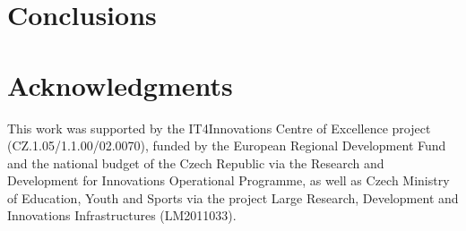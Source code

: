 \documentclass[10pt,a4paper,twocolumn]{article}
\begin{document}
\section{Conclusions}


\section*{Acknowledgments}
This work was supported by the IT4Innovations Centre of Excellence project (CZ.1.05/1.1.00/02.0070), funded by the European Regional Development Fund and the national budget of the Czech Republic via the Research and Development for Innovations Operational Programme, as well as Czech Ministry of Education, Youth and Sports via the project Large Research, Development and Innovations Infrastructures (LM2011033).



\end{document}
